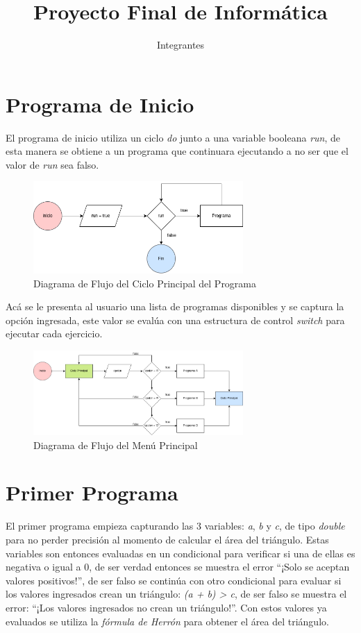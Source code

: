 \documentclass{article}
\title{Proyecto Final de Informática}
\author{Integrantes}
\begin{document}
    \maketitle
    \tableofcontents

\section{Programa de Inicio}

El programa de inicio utiliza un ciclo \emph{do} junto a una variable booleana \emph{run}, de esta manera se obtiene a un programa que continuara ejecutando a no ser que el valor de \emph{run} sea falso. 

\begin{figure}[H]
    \centering
        \centering
    \includegraphics[width=8cm]{loop_inicio}
    \centering
        \centering
        \caption{Diagrama de Flujo del Ciclo Principal del Programa}
\end{figure}

Acá se le presenta al usuario una lista de programas disponibles y se captura la opción ingresada, este valor se evalúa con una estructura de control \emph{switch} para ejecutar cada ejercicio.

\begin{figure}[H]
    \centering
    \includegraphics[width=8cm]{switch_programa}
    \caption{Diagrama de Flujo del Menú Principal}
\end{figure}

\section{Primer Programa}

El primer programa empieza capturando las 3 variables: \emph{a}, \emph{b} y \emph{c}, de tipo \emph{double} para no perder precisión al momento de calcular el área del triángulo. Estas variables son entonces evaluadas en un condicional para verificar si una de ellas es negativa o igual a 0, de ser verdad entonces se muestra el error ``¡Solo se aceptan valores positivos!'', de ser falso se continúa con otro condicional para evaluar si los valores ingresados crean un triángulo: \emph{(a + b) > c}, de ser falso se muestra el error: ``¡Los valores ingresados no crean un triángulo!''. Con estos valores ya evaluados se utiliza la \emph{fórmula de Herrón} para obtener el área del triángulo.
\end{document}
